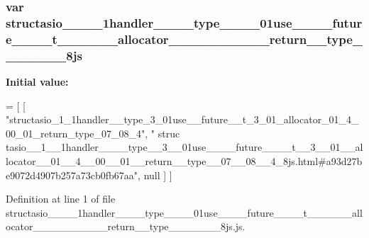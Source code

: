 \subsubsection[{structasio\+\_\+\+\_\+1\+\_\+\+\_\+1handler\+\_\+\+\_\+\+\_\+\+\_\+type\+\_\+\+\_\+3\+\_\+\+\_\+01use\+\_\+\+\_\+\+\_\+\+\_\+future\+\_\+\+\_\+\+\_\+\+\_\+t\+\_\+\+\_\+3\+\_\+\+\_\+01\+\_\+\+\_\+allocator\+\_\+\+\_\+01\+\_\+\+\_\+4\+\_\+\+\_\+00\+\_\+\+\_\+01\+\_\+\+\_\+return\+\_\+\+\_\+type\+\_\+\+\_\+07\+\_\+\+\_\+08\+\_\+\+\_\+4\+\_\+8js}]{\setlength{\rightskip}{0pt plus 5cm}var structasio\+\_\+\+\_\+\_\+\+\_\+1handler\+\_\+\+\_\+\+\_\+\+\_\+type\+\_\+\+\_\+\_\+\+\_\+01use\+\_\+\+\_\+\+\_\+\+\_\+future\+\_\+\+\_\+\+\_\+\+\_\+t\+\_\+\+\_\+\_\+\+\_\+\_\+\+\_\+allocator\+\_\+\+\_\+\_\+\+\_\+\_\+\+\_\+\_\+\+\_\+\_\+\+\_\+return\+\_\+\+\_\+type\+\_\+\+\_\+\_\+\+\_\+\_\+\+\_\+\_\+8js}\label{structasio____1____1handler________type____3____01use________future________t____3____01____alloc84821a121777ad9fd0896d6e7138c292_a8c163f1380da5ca05eebdd4e1b4695d5}
{\bfseries Initial value\+:}
\begin{DoxyCode}
=
[
    [ \textcolor{stringliteral}{"structasio\_1\_1handler\_\_type\_3\_01use\_\_future\_\_t\_3\_01\_allocator\_01\_4\_00\_01\_return\_type\_07\_08\_4"}, \textcolor{stringliteral}{"
      struc
      tasio\_\_1\_\_1handler\_\_\_\_type\_\_3\_\_01use\_\_\_\_future\_\_\_\_t\_\_3\_\_01\_\_allocator\_\_01\_\_4\_\_00\_\_01\_\_return\_\_type\_\_07\_\_08\_\_4\_8js.html#a93d27be9072d4907b257a73cb0fb67aa"}, null ]
]
\end{DoxyCode}


Definition at line 1 of file structasio\+\_\+\+\_\+\_\+\+\_\+1handler\+\_\+\+\_\+\+\_\+\+\_\+type\+\_\+\+\_\+\_\+\+\_\+01use\+\_\+\+\_\+\+\_\+\+\_\+future\+\_\+\+\_\+\+\_\+\+\_\+t\+\_\+\+\_\+\_\+\+\_\+\_\+\+\_\+allocator\+\_\+\+\_\+\_\+\+\_\+\_\+\+\_\+\_\+\+\_\+\_\+\+\_\+return\+\_\+\+\_\+type\+\_\+\+\_\+\_\+\+\_\+\_\+\+\_\+\_\+8js.\+js.

